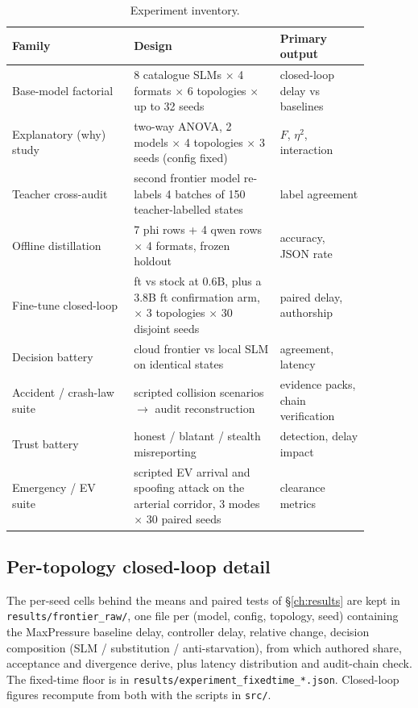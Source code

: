 \begin{table}[t]

\centering
\small
\begin{tabular}{p{0.30\linewidth}p{0.36\linewidth}p{0.22\linewidth}}
\toprule
Family & Design & Primary output \\
\midrule
Base-model factorial & 8 catalogue SLMs $\times$ 4 formats $\times$ 6
topologies $\times$ up to 32 seeds & closed-loop delay vs baselines \\
Explanatory (why) study & two-way ANOVA, 2 models $\times$ 4 topologies
$\times$ 3 seeds (config fixed) & $F$, $\eta^2$, interaction \\
Teacher cross-audit & second frontier model re-labels 4 batches of 150
teacher-labelled states & label agreement \\
Offline distillation & 7 phi rows + 4 qwen rows $\times$ 4 formats,
frozen holdout & accuracy, JSON rate \\
Fine-tune closed-loop & ft vs stock at 0.6B, plus a 3.8B ft confirmation
arm, $\times$ 3 topologies $\times$ 30 disjoint seeds & paired delay, authorship \\
Decision battery & cloud frontier vs local SLM on identical states & agreement, latency \\
Accident / crash-law suite & scripted collision scenarios $\to$ audit
reconstruction & evidence packs, chain verification \\
Trust battery & honest / blatant / stealth misreporting & detection, delay impact \\
Emergency / EV suite & scripted EV arrival and spoofing attack on the
arterial corridor, 3 modes $\times$ 30 paired seeds & clearance metrics \\
\bottomrule
\end{tabular}
\caption{Experiment inventory.}
\label{tab:inventory}
\end{table}

\subsection{Per-topology closed-loop detail}
The per-seed cells behind the means and paired tests of
\S\ref{ch:results} are kept in
\texttt{results/frontier\_raw/}, one file per (model, config, topology,
seed) containing the MaxPressure baseline delay, controller delay,
relative change, decision composition (SLM / substitution /
anti-starvation), from which authored share, acceptance and divergence
derive, plus latency distribution and audit-chain check. The fixed-time
floor is in \texttt{results/experiment\_fixedtime\_*.json}. Closed-loop
figures recompute from both with the scripts in \texttt{src/}.

